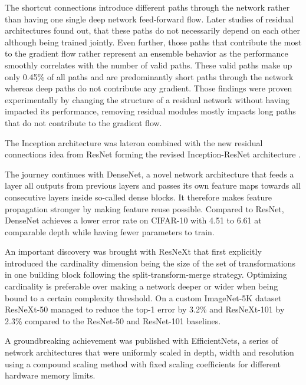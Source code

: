 The shortcut connections introduce different paths through the network rather than having one single deep network feed-forward flow. Later studies of residual architectures found out, that these paths do not necessarily depend on each other although being trained jointly. Even further, those paths that contribute the most to the gradient flow rather represent an ensemble behavior as the performance smoothly correlates with the number of valid paths. These valid paths make up only 0.45\% of all paths and are predominantly short paths through the network whereas deep paths do not contribute any gradient. Those findings were proven experimentally by changing the structure of a residual network without having impacted its performance, removing residual modules mostly impacts long paths that do not contribute to the gradient flow. \cite{AndreasVeit.2016}

The Inception architecture was lateron combined with the new residual connections idea from ResNet forming the revised Inception-ResNet architecture \cite{ChristianSzegedy.2016}.

The journey continues with DenseNet, a novel network architecture that feeds a layer all outputs from previous layers and passes its own feature maps towards all consecutive layers inside so-called dense blocks. It therefore makes feature propagation stronger by making feature reuse possible. Compared to ResNet, DenseNet achieves a lower error rate on CIFAR-10 \cite{AlexKrizhevsky.2009} with 4.51 to 6.61 at comparable depth while having fewer parameters to train. \cite{GaoHuang.2016}

An important discovery was brought with ResNeXt that first explicitly introduced the cardinality dimension being the size of the set of transformations in one building block following the split-transform-merge strategy. Optimizing cardinality is preferable over making a network deeper or wider when being bound to a certain complexity threshold. On a custom ImageNet-5K dataset ResNeXt-50 managed to reduce the top-1 error by 3.2\% and ResNeXt-101 by 2.3\% compared to the ResNet-50 and ResNet-101 baselines. \cite{SainingXie.2017}

A groundbreaking achievement was published with EfficientNets, a series of network architectures that were uniformly scaled in depth, width and resolution using a compound scaling method with fixed scaling coefficients for different hardware memory limits. 


